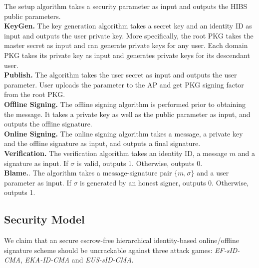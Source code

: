 \documentclass[times]{secauth}
\theoremstyle{definition}
\theoremstyle{remark}
\begin{document}
The setup algorithm takes a security parameter as input and outputs the HIBS public parameters. 
\vspace{0.1cm}
\\
\textbf{KeyGen.}
The key generation algorithm takes a secret key and an identity ID as input and outputs the user private key. 
More specifically, the root PKG takes the master secret as input and can generate private keys for any user.
Each domain PKG takes its private key as input and generates private keys for its descendant user.
\vspace{0.1cm}
\\
\textbf{Publish.}
The algorithm takes the user secret as input and outputs the user parameter. 
User uploads the parameter to the AP and get PKG signing factor from the root PKG.
\vspace{0.1cm}
\\
\textbf{Offline Signing.}
The offline signing algorithm is performed prior to obtaining the message. 
It takes a private key as well as the public parameter as input, and outputs the offline signature.
\\
\textbf{Online Signing.}
The online signing algorithm takes a message, a private key and the offline signature as input, and outputs a final signature.
\vspace{0.1cm}
\\
\textbf{Verification.}
The verification algorithm takes an identity $\mathrm{ID}$, a message $m$ and a signature as input.
If $\sigma$ is valid, outputs 1. 
Otherwise, outputs 0.
\vspace{0.1cm}
\\
\textbf{Blame.}. 
The algorithm takes a message-signature pair $\{m, \sigma\}$  and a user parameter as input.
If $\sigma$ is generated by an honest signer, outputs 0.
Otherwise, outputs 1.

\subsection{Security Model}
We claim that an secure escrow-free hierarchical identity-based online/offline signature scheme should be uncrackable against three attack games: \emph{EF-sID-CMA}, \emph{EKA-ID-CMA} and \emph{EUS-sID-CMA}. 
\par
\end{document}
